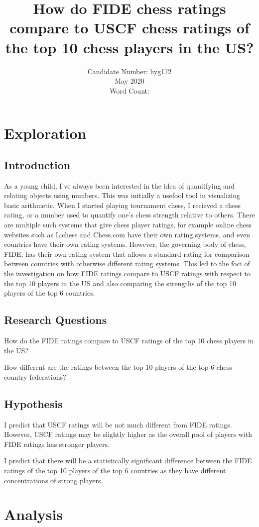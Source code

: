 \documentclass[12pt, titlepage]{article}
\title{\normalsize How do FIDE chess ratings compare to USCF chess ratings of the top 10 chess players in the US?}
\date{\normalsize Candidate Number: hyg172 \\ May 2020 \\ Word Count:}
\begin{document}
\maketitle
\tableofcontents
\newpage

\section{Exploration}
\subsection{Introduction}
As a young child, I've always been interested in the idea of quantifying and relating objects using numbers. This was initially a usefool tool in visualizing basic arithmetic. When I started playing tournament chess, I recieved a chess rating, or a number used to quantify one's chess strength relative to others. There are multiple such systems that give chess player ratings, for example online chess websites such as Lichess and Chess.com have their own rating systems, and even countries have their own rating systems. However, the governing body of chess, FIDE, has their own rating system that allows a standard rating for comparison between countries with otherwise different rating systems. This led to the foci of the investigation on how FIDE ratings compare to USCF ratings with respect to the top 10 players in the US and also comparing the strengths of the top 10 players of the top 6 countries.
\subsection{Research Questions}
How do the FIDE ratings compare to USCF ratings of the top 10 chess players in the US?

How different are the ratings between the top 10 players of the top 6 chess country federations?
\subsection{Hypothesis}
I predict that USCF ratings will be not much different from FIDE ratings. However, USCF ratings may be slightly higher as the overall pool of players with FIDE ratings has stronger players.

I predict that there will be a statistically significant difference between the FIDE ratings of the top 10 players of the top 6 countries as they have different concentrations of strong players. 

\section{Analysis}
\end{document}

